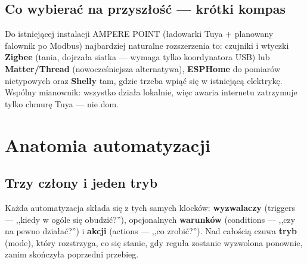 \documentclass[11pt,a4paper]{article}
\begin{document}
\subsection{Co wybierać na przyszłość --- krótki kompas}

Do istniejącej instalacji AMPERE POINT (ładowarki Tuya + planowany falownik po Modbus) najbardziej naturalne rozszerzenia to: czujniki i wtyczki \textbf{Zigbee} (tania, dojrzała siatka --- wymaga tylko koordynatora USB) lub \textbf{Matter/Thread} (nowocześniejsza alternatywa), \textbf{ESPHome} do pomiarów nietypowych oraz \textbf{Shelly} tam, gdzie trzeba wpiąć się w istniejącą elektrykę. Wspólny mianownik: wszystko działa lokalnie, więc awaria internetu zatrzymuje tylko chmurę Tuya --- nie dom.

\section{Anatomia automatyzacji}
\label{sec:anatomia}

\subsection{Trzy człony i jeden tryb}

Każda automatyzacja składa się z tych samych klocków: \textbf{wyzwalaczy} (triggers --- ,,kiedy w ogóle się obudzić?''), opcjonalnych \textbf{warunków} (conditions --- ,,czy na pewno działać?'') i \textbf{akcji} (actions --- ,,co zrobić?''). Nad całością czuwa \textbf{tryb} (mode), który rozstrzyga, co się stanie, gdy reguła zostanie wyzwolona ponownie, zanim skończyła poprzedni przebieg.

\begin{center}
\end{center}
\end{document}
